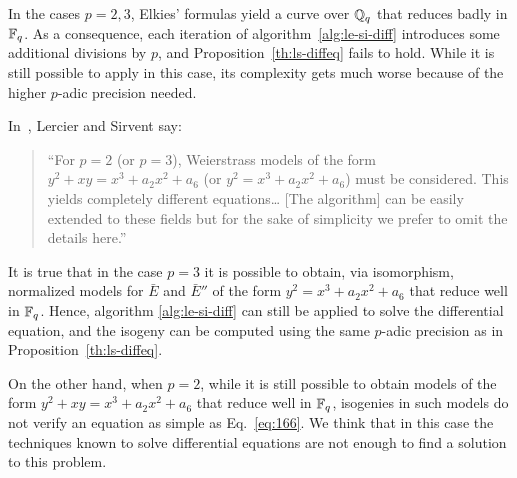 \begin{nota}
    In the cases $p=2,3$, Elkies' formulas yield a curve
  over $\mathbb{Q}_q$ that reduces badly in $\mathbb{F}_q$. As a consequence, each
  iteration of algorithm~\ref{alg:le-si-diff} introduces some
  additional divisions by $p$, and Proposition~\ref{th:ls-diffeq}
  fails to hold. While it is still possible to apply
   in this case, its complexity gets much worse
  because of the higher $p$-adic precision needed.

  In~\cite{lercier+sirvent08}, Lercier and Sirvent say:
  \begin{quote}
    ``For $p = 2$ (or $p = 3$), Weierstrass models of the form $y^2 + xy
    = x^3 + a_2 x^2 + a_6$ (or $y^2 = x^3 + a_2 x^2 + a_6$) must be
    considered. This yields completely different equations\dots{} [The
    algorithm] can be easily extended to these fields but for the
    sake of simplicity we prefer to omit the details here.''
  \end{quote}
  
  It is true that in the case $p=3$ it is possible to obtain, via
  isomorphism, normalized models for $\bar{E}$ and $\bar{E}''$ of the
  form $y^2 = x^3 + a_2 x^2 + a_6$ that reduce well in $\mathbb{F}_q$. Hence,
  algorithm \ref{alg:le-si-diff} can still be applied to solve the
  differential equation, and the isogeny can be computed using the
  same $p$-adic precision as in Proposition~\ref{th:ls-diffeq}.

  On the other hand, when $p=2$, while it is still possible to obtain
  models of the form $y^2 + xy = x^3 + a_2 x^2 + a_6$ that reduce well
  in $\mathbb{F}_q$, isogenies in such models do not verify an equation as
  simple as Eq.~\eqref{eq:166}. We think that in this case the
  techniques known to solve differential equations are not enough to
  find a solution to this problem.
\end{nota}


%
